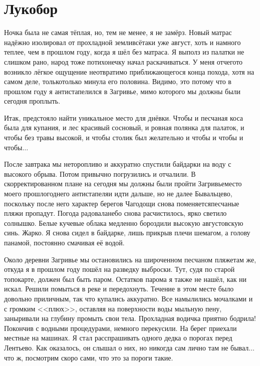 \chapter{Лукобор} 

Ночка была не самая тёплая, но, тем не менее, я не замёрз. Новый матрас надёжно изолировал от прохладной земли\mdash всё\sdash таки уже август, хоть и намного теплее, чем в прошлом году, когда я шёл без матраса. Я выполз из палатки не слишком рано, народ тоже потихонечку начал раскачиваться. У меня отчего\sdash то возникло лёгкое ощущение неотвратимо приближающегося конца похода, хотя на самом деле, только\sdash только минула его половина. Видимо, это потому что в прошлом году я антистапелился в Загривье, мимо которого мы должны были сегодня проплыть. 
 
Итак, предстояло найти уникальное место для днёвки. Чтобы и песчаная коса была для купания, и лес красивый сосновый, и ровная полянка для палаток, и чтобы без травы высокой, и чтобы столик был желательно и чтобы и чтобы и чтобы$\ldots$  

После завтрака мы неторопливо и аккуратно спустили байдарки на воду с высокого обрыва. Потом привычно погрузились и отчалили. В скорректированном плане на сегодня мы должны были пройти Загривье\mdash место моего прошлогоднего антистапеля\mdash и идти дальше, но не далее Бывальцево, поскольку после него характер берегов Чагодощи снова поменяется\mdash песчаные пляжи пропадут. Погода радовала\mdash небо снова расчистилось, ярко светило солнышко. Белые кучевые облака медленно бороздили высокую августовскую синь. Жарко. Я снова сидел в байдарке, лишь прикрыв плечи шемагом, а голову панамой, постоянно смачивая её водой. 

Около деревни Загривье мы остановились на широченном песчаном пляже\mdash там же, откуда я в прошлом году пошёл на разведку выброски. Тут, судя по старой топокарте, должен был быть паром. Остатков парома я также не нашёл, как ни искал. Решили помыться в реке и передохнуть. Течение в этом месте было довольно приличным, так что купались аккуратно. Все намылились мочалками и с громким <<плюх>>, оставляя на поверхности воды мыльную пену, заныривали на глубину промыть свои тела. Прохладная водичка приятно бодрила! Покончив с водными процедурами, немного перекусили. На берег приехали местные на машинах. Я стал расспрашивать одного дедка о порогах перед Лентьево. Как оказалось, он слышал о них, но никогда сам лично там не бывал$\ldots$ что ж, посмотрим скоро сами, что это за пороги такие. 

